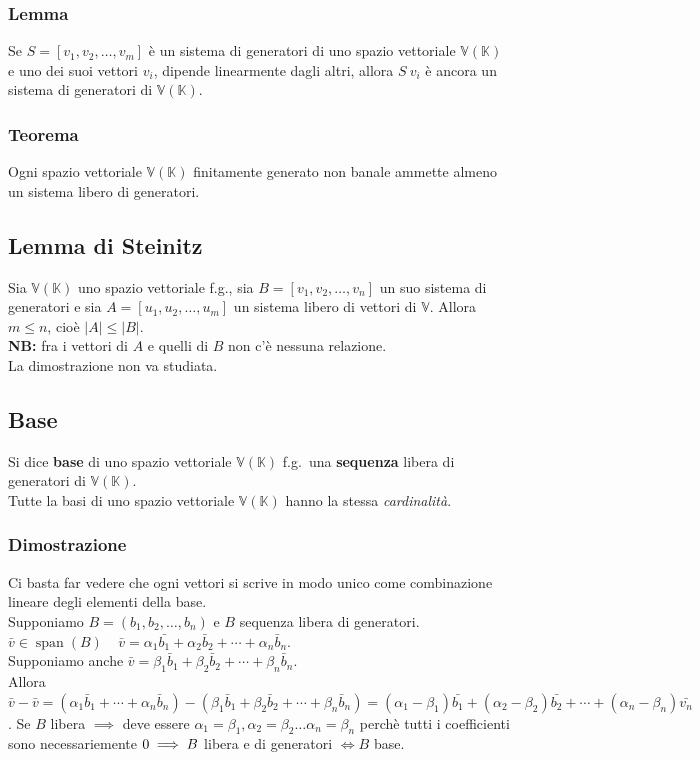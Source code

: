 \documentclass{article}
\DeclareMathOperator{\Span}{span}
\newcommand{\V}{\mathbb{V} (\mathbb{K})}
\newcommand{\s}[2]{#1_1, #1_2, \ldots, #1_{#2}}
\begin{document}
\subsubsection{Lemma}
Se $S = [\s{v}{m}]$ è un sistema di generatori di uno spazio vettoriale $\V$ e
uno dei suoi vettori $v_i$, dipende linearmente dagli altri, allora $S \ {v_i}$
è ancora un sistema di generatori di $\V$.

\subsubsection{Teorema}
Ogni spazio vettoriale $\V$ finitamente generato non banale ammette almeno un
sistema libero di generatori.

\subsection{Lemma di Steinitz}
Sia $\V$ uno spazio vettoriale f.g., sia $B=[\s{v}{n}]$ un suo sistema di
generatori e sia $A=[\s{u}{m}]$ un sistema libero di vettori di $\mathbb V$.
Allora $m\leq n$, cioè $|A|\leq|B|$.\\
\textbf{NB:} fra i vettori di $A$ e quelli di $B$ non c'è nessuna relazione.\\
La dimostrazione non va studiata.

\subsection{Base}
Si dice \textbf{base} di uno spazio vettoriale $\V$ f.g.\ una \textbf{sequenza}
libera di generatori di $\V$. \\ Tutte la basi di uno spazio vettoriale $\V$
hanno la stessa \textit{cardinalità}.

\subsubsection{Dimostrazione}
Ci basta far vedere che ogni vettori si scrive in modo unico come combinazione
lineare degli elementi della base.\\ Supponiamo $B=(\s{b}{n})$ e $B$ sequenza
libera di generatori.\\ $\bar v \in \Span(B) \ \ \ \ \ \bar v =
    \alpha_1\bar{b_1}+\alpha_2\bar b_2 + \cdots +\alpha_n\bar b_n$.\\ Supponiamo
anche $\bar v = \beta_1\bar b_1+\beta_2\bar b_2 + \cdots +\beta_n\bar b_n$.\\
Allora $\bar{v}-\bar v = (\alpha_1\bar b_1+\cdots+\alpha_n\bar b_n) -
    (\beta_1\bar b_1+\beta_2\bar b_2 + \cdots +\beta_n\bar b_n) =
    (\alpha_1-\beta_1)\bar{b_1}+(\alpha_2-\beta_2)\bar{b_2}+\cdots+(\alpha_n-\beta_n)\bar{v_n}$.
Se $B$ libera $\implies$ deve essere $\alpha_1 = \beta_1, \alpha_2 = \beta_2
    \ldots \alpha_n = \beta_n$ perchè tutti i coefficienti sono necessariemente
$0\\ \implies B$ libera e di generatori $\iff B$ base.
\end{document}

